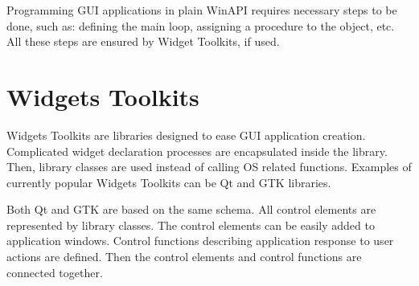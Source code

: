 Programming GUI applications in plain WinAPI requires necessary steps to be done, such as: defining the main loop, assigning a procedure to the object, etc. All these steps are ensured by Widget Toolkits, if used. 

\begin{comment}

\section{GUI programming in Windows API}
Development of GUI application for Windows is possible with Windows API. This is the name given to a set of various APIs - communication interfaces for performing services. These communication interfaces offer manipulation with file-system, devices and also creating graphic windows.

Most common parts of Windows API are:
\begin{itemize}
\item \clist{kernel32.dll}, which is needed for memory management, input/output, process and thread creation.
\item \clist{user32.dll} for creating GUI elements, such as windows, buttons, etc.
\item \clist{shell32.dll} which offers access to Windows command line
\item \clist{WinSock} to use network
\end{itemize}
\end{comment}

\section{Widgets Toolkits}
\label{guiframeworks}
Widgets Toolkits are libraries designed to ease GUI application creation. Complicated widget declaration processes are encapsulated inside the library. Then, library classes are used instead of calling OS related functions. Examples of currently popular Widgets Toolkits can be Qt and GTK libraries\cite[pages~413-416]{qtvsgtk}.

Both Qt and GTK are based on the same schema. All control elements are represented by library classes. The control elements can be easily added to application windows. Control functions describing application response to user actions are defined. Then the control elements and control functions are connected together.

